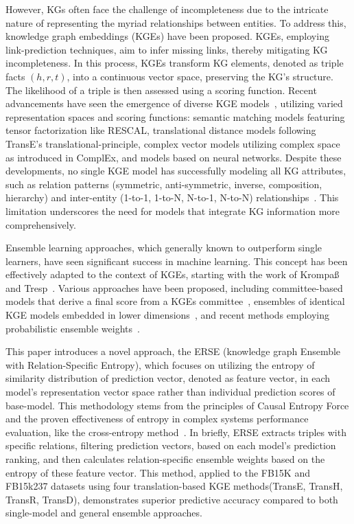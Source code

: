 \documentclass{article}
\begin{document}
However, KGs often face the challenge of incompleteness due to the intricate nature of representing the myriad relationships between entities. To address this, knowledge graph embeddings (KGEs) have been proposed. KGEs, employing link-prediction techniques, aim to infer missing links, thereby mitigating KG incompleteness. In this process, KGEs transform KG elements, denoted as triple facts $(h, r, t)$, into a continuous vector space, preserving the KG's structure. The likelihood of a triple is then assessed using a scoring function. Recent advancements have seen the emergence of diverse KGE models~\cite{ji2021survey}, utilizing varied representation spaces and scoring functions: semantic matching models featuring tensor factorization like RESCAL, translational distance models following TransE's translational-principle, complex vector models utilizing complex space as introduced in ComplEx, and models based on neural networks. Despite these developments, no single KGE model has successfully modeling all KG attributes, such as relation patterns (symmetric, anti-symmetric, inverse, composition, hierarchy) and inter-entity (1-to-1, 1-to-N, N-to-1, N-to-N) relationships~\cite{WANG20221041,choi2020approach}. This limitation underscores the need for models that integrate KG information more comprehensively.

Ensemble learning approaches, which generally known to outperform single learners, have seen significant success in machine learning. This concept has been effectively adapted to the context of KGEs, starting with the work of Krompaß and Tresp~\cite{krompass2015ensemble}. Various approaches have been proposed, including committee-based models that derive a final score from a KGEs committee~\cite{choi2020approach}, ensembles of identical KGE models embedded in lower dimensions~\cite{9533372}, and recent methods employing probabilistic ensemble weights~\cite{WANG20221041}.

This paper introduces a novel approach, the ERSE (knowledge graph Ensemble with Relation-Specific Entropy), which focuses on utilizing the entropy of similarity distribution of prediction vector, denoted as feature vector, in each model's representation vector space rather than individual prediction scores of base-model. This methodology stems from the principles of Causal Entropy Force and the proven effectiveness of entropy in complex systems performance evaluation, like the cross-entropy method~\cite{wissner2013causal, de2005tutorial}. In briefly, ERSE extracts triples with specific relations, filtering prediction vectors, based on each model's prediction ranking, and then calculates relation-specific ensemble weights based on the entropy of these feature vector. This method, applied to the FB15K and FB15k237 datasets using four translation-based KGE methods(TransE, TransH, TransR, TransD), demonstrates superior predictive accuracy compared to both single-model and general ensemble approaches.
\end{document}
